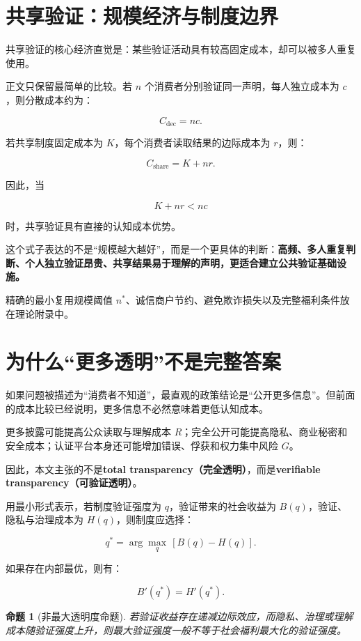 \documentclass[UTF8,12pt]{ctexart}
\newtheorem{proposition}{命题}
\begin{document}
\section{共享验证：规模经济与制度边界}

共享验证的核心经济直觉是：某些验证活动具有较高固定成本，却可以被多人重复使用。

正文只保留最简单的比较。若 $n$ 个消费者分别验证同一声明，每人独立成本为 $c$，则分散成本约为：

\[
C_{\mathrm{dec}}=nc.
\]

若共享制度固定成本为 $K$，每个消费者读取结果的边际成本为 $r$，则：

\[
C_{\mathrm{share}}=K+nr.
\]

因此，当

\[
K+nr<nc
\]

时，共享验证具有直接的认知成本优势。

这个式子表达的不是“规模越大越好”，而是一个更具体的判断：\textbf{高频、多人重复判断、个人独立验证昂贵、共享结果易于理解的声明，更适合建立公共验证基础设施。}

精确的最小复用规模阈值 $n^*$、诚信商户节约、避免欺诈损失以及完整福利条件放在理论附录中。

\section{为什么“更多透明”不是完整答案}

如果问题被描述为“消费者不知道”，最直观的政策结论是“公开更多信息”。但前面的成本比较已经说明，更多信息不必然意味着更低认知成本。

更多披露可能提高公众读取与理解成本 $R$；完全公开可能提高隐私、商业秘密和安全成本；认证平台本身还可能增加错误、俘获和权力集中风险 $G$。

因此，本文主张的不是\textbf{total transparency（完全透明）}，而是\textbf{verifiable transparency（可验证透明）}。

用最小形式表示，若制度验证强度为 $q$，验证带来的社会收益为 $B(q)$，验证、隐私与治理成本为 $H(q)$，则制度应选择：

\[
q^*=\arg\max_q\,[B(q)-H(q)].
\]

如果存在内部最优，则有：

\[
B'(q^*)=H'(q^*).
\]

\begin{proposition}[非最大透明度命题]
若验证收益存在递减边际效应，而隐私、治理或理解成本随验证强度上升，则最大验证强度一般不等于社会福利最大化的验证强度。
\end{proposition}
\end{document}
